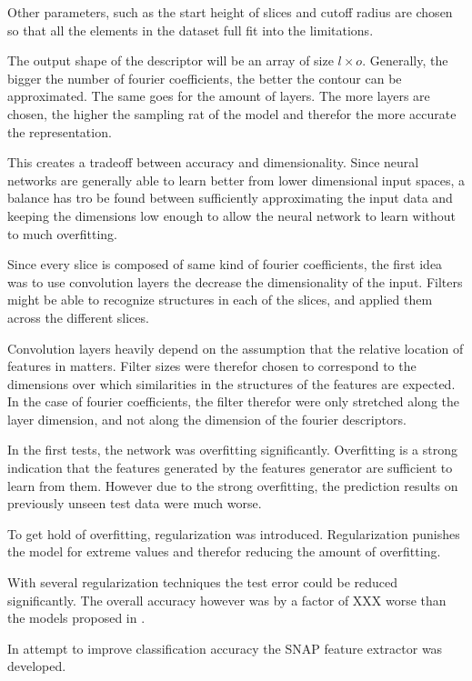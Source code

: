 Other parameters, such as the start height of slices and cutoff radius are chosen so that all the elements in 
the dataset full fit into the limitations.

The output shape of the descriptor will be an array of size $l \times o$.
Generally, the bigger the number of fourier coefficients, the better the contour can be approximated.
The same goes for the amount of layers. 
The more layers are chosen, the higher the sampling rat of the model and therefor the more accurate the representation.

This creates a tradeoff between accuracy and dimensionality.
Since neural networks are generally able to learn better from lower dimensional input spaces, 
a balance has tro be found between sufficiently approximating the input data and keeping the 
dimensions low enough to allow the neural network to learn without to much overfitting.



Since every slice is composed of same kind of fourier coefficients, the first idea was to use convolution layers the decrease the dimensionality of the input.
Filters might be able to recognize structures in each of the slices, and applied them across the different slices.

Convolution layers heavily depend on the assumption that the relative location of features in matters.
Filter sizes were therefor chosen to correspond to the dimensions over which similarities in the structures of the features are expected.
In the case of fourier coefficients, the filter therefor were only stretched along the layer dimension, and not along the dimension of the fourier descriptors.

In the first tests, the network was overfitting significantly.
Overfitting is a strong indication that the features generated by the features generator are sufficient to learn from them.
However due to the strong overfitting, the prediction results on previously unseen test data were much worse.

To get hold of overfitting, regularization was introduced.
Regularization punishes the model for extreme values and therefor reducing the amount of overfitting.

With several regularization techniques the test error could be reduced significantly. 
The overall accuracy however was by a factor of XXX worse than the models proposed in \cite{friederich_dos}.

In attempt to improve classification accuracy the SNAP feature extractor was developed.

